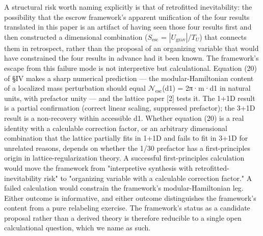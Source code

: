 \documentclass[11pt]{article}
\begin{document}
A structural risk worth naming explicitly is that of retrofitted
inevitability: the possibility that the escrow framework's apparent
unification of the four results translated in this paper is an artifact
of having seen those four results first and then constructed a
dimensional combination ($S_{\mathrm{esc}}$ = $|U_{\mathrm{grav}}|$/$T_{U}$) that connects them in
retrospect, rather than the proposal of an organizing variable that
would have constrained the four results in advance had it been known.
The framework's escape from this failure mode is not interpretive but
calculational. Equation (20) of §IV makes a sharp numerical prediction
--- the modular-Hamiltonian content of a localized mass perturbation
should equal $\mathcal{N}_{\mathrm{esc}}$(d1) = 2π·m·d1 in natural units, with prefactor unity
--- and the lattice paper [2] tests it. The 1+1D result is a partial
confirmation (correct linear scaling, suppressed prefactor); the 3+1D
result is a non-recovery within accessible d1. Whether equation (20) is
a real identity with a calculable correction factor, or an arbitrary
dimensional combination that the lattice partially fits in 1+1D and
fails to fit in 3+1D for unrelated reasons, depends on whether the 1/30
prefactor has a first-principles origin in lattice-regularization
theory. A successful first-principles calculation would move the
framework from "interpretive synthesis with retrofitted-inevitability
risk" to "organizing variable with a calculable correction factor." A
failed calculation would constrain the framework's modular-Hamiltonian
leg. Either outcome is informative, and either outcome distinguishes the
framework's content from a pure relabeling exercise. The framework's
status as a candidate proposal rather than a derived theory is therefore
reducible to a single open calculational question, which we name as
such.
\end{document}
